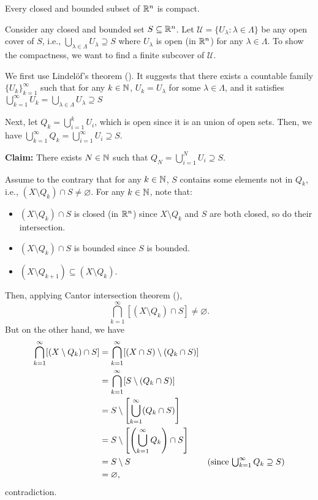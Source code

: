 \begin{enumerate}
\begin{theorem}
\label{thm:heine-borel}
Every closed and bounded subset of \(\mathbb{R}^n\) is compact.
\end{theorem}
\begin{pf}
Consider any closed and bounded set \(S\subseteq \mathbb{R}^n\). Let
\(\mathcal{U}=\{U_{\lambda}:\lambda\in\Lambda\}\) be any open cover of \(S\),
i.e., \(\bigcup_{\lambda\in\Lambda}U_{\lambda}\supseteq S\) where
\(U_{\lambda}\) is open (in \(\mathbb{R}^n\)) for any \(\lambda\in\Lambda\). To show
the compactness, we want to find a finite subcover of \(\mathcal{U}\).

We first use Lindel\"o{f}'s theorem (). It suggests that
there exists a countable family \(\{U_k\}_{k=1}^{\infty}\) such that for any
\(k\in\mathbb{N}\), \(U_k=U_{\lambda}\) for some \(\lambda\in\Lambda\), and it
satisfies
\(\bigcup_{k=1}^{\infty}U_k=\bigcup_{\lambda\in\Lambda}U_{\lambda}\supseteq S\)

Next, let \(Q_k=\bigcup_{i=1}^{k}U_i\), which is open since it is an union of
open sets. Then, we have
\(\bigcup_{k=1}^{\infty}Q_k=\bigcup_{i=1}^{\infty}U_i\supseteq S.\)

\textbf{Claim:} There exists \(N\in\mathbb{N}\) such that
\(Q_{N}=\bigcup_{i=1}^{N}U_i\supseteq S\).

\begin{pf}
Assume to the contrary that for any \(k\in\mathbb{N}\), \(S\) contains some elements
not in \(Q_k\), i.e., \((X\setminus Q_{k})\cap S\ne\varnothing\). For any
\(k\in\mathbb{N}\), note that:
\begin{itemize}
\item \((X\setminus Q_k)\cap S\) is closed (in \(\mathbb{R}^n\)) since \(X\setminus
Q_k\) and \(S\) are both closed, so do their intersection.
\item \((X\setminus Q_k)\cap S\) is bounded since \(S\) is bounded.
\item \((X\setminus Q_{k+1})\subseteq (X\setminus Q_k)\).
\end{itemize}
Then, applying Cantor intersection theorem (),
\[
\bigcap_{k=1}^{\infty}[(X\setminus Q_k)\cap S]\ne\varnothing.
\]
But on the other hand, we have
\begin{align*}
\bigcap_{k=1}^{\infty}[(X\setminus Q_k)\cap S]
&=\bigcap_{k=1}^{\infty}[(X\cap S)\setminus (Q_k\cap S)]\\
&=\bigcap_{k=1}^{\infty}[S\setminus (Q_k\cap S)]\\
&=S\setminus \qty[\bigcup_{k=1}^{\infty}(Q_k\cap S)]\\
&=S\setminus \qty[\qty(\bigcup_{k=1}^{\infty}Q_k)\cap S]\\
&=S\setminus S&\text{(since \(\textstyle\bigcup_{k=1}^{\infty}Q_k\supseteq S\))}\\
&=\varnothing,
\end{align*}
contradiction.
\end{pf}


\end{pf}
\end{enumerate}
